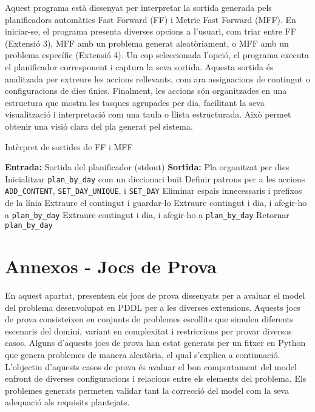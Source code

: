 \documentclass[a4paper]{article}
\begin{document}
	Aquest programa està dissenyat per interpretar la sortida generada pels planificadors automàtics Fast Forward (FF) i Metric Fast Forward (MFF). En iniciar-se, el programa presenta diverses opcions a l'usuari, com triar entre FF (Extensió 3), MFF amb un problema generat aleatòriament, o MFF amb un problema específic (Extensió 4). Un cop seleccionada l'opció, el programa executa el planificador corresponent i captura la seva sortida. Aquesta sortida és analitzada per extreure les accions rellevants, com ara assignacions de contingut o configuracions de dies únics. Finalment, les accions són organitzades en una estructura que mostra les tasques agrupades per dia, facilitant la seva visualització i interpretació com una taula o llista estructurada. Això permet obtenir una visió clara del pla generat pel sistema.
	
	\begin{algorithm}[H]
		\caption{Intèrpret de sortides de FF i MFF}\label{alg:ffinterpreter}
		\begin{algorithmic}[1]
			\State \textbf{Entrada:} Sortida del planificador (stdout)
			\State \textbf{Sortida:} Pla organitzat per dies
			\State Inicialitzar \texttt{plan\_by\_day} com un diccionari buit
			\State Definir patrons per a les accions \texttt{ADD\_CONTENT}, \texttt{SET\_DAY\_UNIQUE}, i \texttt{SET\_DAY}
			\State Eliminar espais innecessaris i prefixos de la línia
			\State Extraure el contingut i guardar-lo
			\State Extraure contingut i dia, i afegir-ho a \texttt{plan\_by\_day}
			\State Extraure contingut i dia, i afegir-ho a \texttt{plan\_by\_day}
			\EndIf
			\EndFor
			\State Retornar \texttt{plan\_by\_day}
		\end{algorithmic}
	\end{algorithm}
	
	\newpage
	\section{Annexos - Jocs de Prova}
	
	En aquest apartat, presentem els jocs de prova dissenyats per a avaluar el model del problema desenvolupat en PDDL per a les diverses extensions. Aquests jocs de prova consisteixen en conjunts de problemes escollits que simulen diferents escenaris del domini, variant en complexitat i restriccions per provar diversos casos. Alguns d'aquests jocs de prova han estat generats per un fitxer en Python que genera problemes de manera aleatòria, el qual s'explica a continuació. L'objectiu d'aquests casos de prova és avaluar el bon comportament del model enfront de diverses configuracions i relacions entre els elements del problema. Els problemes generats permeten validar tant la correcció del model com la seva adequació als requisits plantejats. 
	
\end{document}
